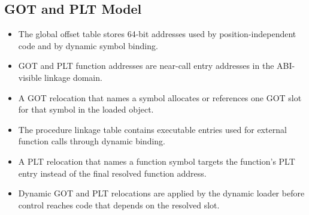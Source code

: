 \documentclass[10pt,twoside]{article}
\begin{document}
\subsection{GOT and PLT Model}
\begin{itemize}
\item The global offset table stores 64-bit addresses used by position-independent code and by dynamic symbol binding.
\item GOT and PLT function addresses are near-call entry addresses in the ABI-visible linkage domain.
\item A GOT relocation that names a symbol allocates or references one GOT slot for that symbol in the loaded object.
\item The procedure linkage table contains executable entries used for external function calls through dynamic binding.
\item A PLT relocation that names a function symbol targets the function's PLT entry instead of the final resolved function address.
\item Dynamic GOT and PLT relocations are applied by the dynamic loader before control reaches code that depends on the resolved slot.
\end{itemize}
\end{document}
